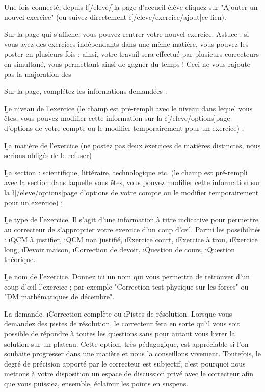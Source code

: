 ﻿Une fois connecté, depuis \l[/eleve/]{la page d'accueil élève} cliquez sur "Ajouter un nouvel exercice" (ou suivez directement \l[/eleve/exercice/ajout]{ce lien}).

Sur la page qui s'affiche, vous pouvez rentrer votre nouvel exercice.
\b{Astuce} : si vous avez des exercices indépendants dans une même matière, vous pouvez les poster en plusieurs fois : ainsi, votre travail sera effectué par plusieurs correcteurs en simultané, vous permettant ainsi de gagner du temps ! Ceci ne vous rajoute pas la majoration des %

Sur la page, complétez les informations demandées :
\item \b{Le niveau de l'exercice} (le champ est pré-rempli avec le niveau dans lequel vous êtes, vous pouvez modifier cette information sur la \l[/eleve/options]{page d'options de votre compte} ou le modifier temporairement pour un exercice) ;
\item \b{La matière} de l'exercice (ne postez pas deux exercices de matières distinctes, nous serions obligés de le refuser)
\item \b{La section} : scientifique, littéraire, technologique etc. (le champ est pré-rempli avec la section dans laquelle vous êtes, vous pouvez modifier cette information sur la \l[/eleve/options]{page d'options de votre compte} ou le modifier temporairement pour un exercice) ;
\item \b{Le type de l'exercice}. Il s'agit d'une information à titre indicative pour permettre au correcteur de s'approprier votre exercice d'un coup d'œil. Parmi les possibilités : \i{QCM à justifier}, \i{QCM non justifié}, \i{Exercice court}, \i{Exercice à trou}, \i{Exercice long}, \i{Devoir maison}, \i{Correction de devoir}, \i{Question de cours}, \i{Question théorique}.
\item \b{Le nom de l'exercice}. Donnez ici un nom qui vous permettra de retrouver d'un coup d'œil l'exercice ; par exemple "Correction test physique sur les forces" ou "DM mathématiques de décembre".
\item \b{La demande}. \i{Correction complète} ou \i{Pistes de résolution}. Lorsque vous demandez des pistes de résolution, le correcteur fera en sorte qu'il vous soit possible de répondre à toutes les questions sans pour autant vous livrer la solution sur un plateau. Cette option, très pédagogique, est appréciable si l'on souhaite progresser dans une matière et nous la conseillons vivement. Toutefois, le degré de précision apporté par le correcteur est subjectif, c'est pourquoi nous mettons à votre disposition un espace de discussion privé avec le correcteur afin que vous puissiez, ensemble, éclaircir les points en suspens.
